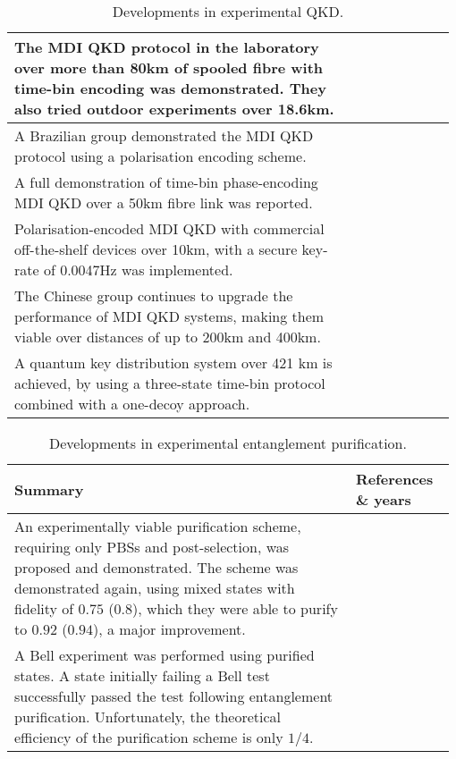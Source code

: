 \begin{table*}[!htbp]
\begin{tabular}{|p{0.755\linewidth}|p{0.22\linewidth}|}
The MDI QKD protocol in the laboratory over more than 80km of spooled fibre with time-bin encoding was demonstrated. They also tried outdoor experiments over 18.6km.&\cite{bib:PRL_111_130501}\\
\hline
A Brazilian group demonstrated the MDI QKD protocol using a polarisation encoding scheme.&\cite{bib:PRA_88_052303}\\
\hline
A full demonstration of time-bin phase-encoding MDI QKD over a 50km fibre link was reported.&\cite{bib:PRL_111_130502}\\
\hline
Polarisation-encoded MDI QKD with commercial off-the-shelf devices over 10km, with a secure key-rate of 0.0047Hz was implemented.&\cite{bib:PRL_112_190503}\\
\hline
The Chinese group continues to upgrade the performance of MDI QKD systems, making them viable over distances of up to 200km and 400km.&\cite{bib:PRL_113_190501, bib:yin2016measurement}
\\
\hline
A quantum key distribution system over 421 km is achieved, by using a three-state time-bin protocol combined with a one-decoy approach. &\cite{bib:boaron2018secure}
\\
\hline
\end{tabular}
\captionspacetab \caption{Developments in experimental QKD.} \label{tab:QKD_table}
\end{table*}

\begin{table*}[!htbp]
\begin{tabular}{|p{0.755\linewidth}|p{0.22\linewidth}|}
	\hline
	Summary & References \& years \\
	\hline \hline
	An experimentally viable purification scheme, requiring only PBSs and post-selection, was proposed and demonstrated. The scheme was demonstrated again, using mixed states with fidelity of $0.75$ ($0.8$), which they were able to purify to $0.92$ ($0.94$), a major improvement. & \cite{bib:Pan01, bib:Pan03} \\
	\hline
	A Bell experiment was performed using purified states. A state initially failing a Bell test successfully passed the test following entanglement purification. Unfortunately, the theoretical efficiency of the purification scheme is only $1/4$. & \cite{bib:PRL_94_040504, bib:Pan01} \\
	\hline
\end{tabular}
\captionspacetab \caption{Developments in experimental entanglement purification.} \label{tab:ent_pur}
\end{table*}

